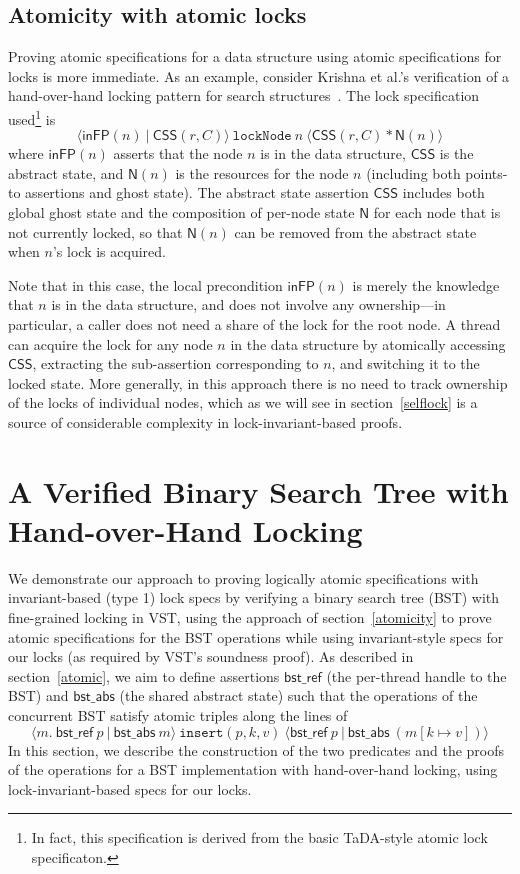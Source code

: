 \documentclass[runningheads]{llncs}
\newcommand{\treerep}{\ensuremath{\mathsf{bst\_abs}}}
\newcommand{\nodeboxrep}{\ensuremath{\mathsf{bst\_ref}}}
\begin{document}
\subsection{Atomicity with atomic locks}
Proving atomic specifications for a data structure using atomic specifications for locks is more immediate. As an example, consider Krishna et al.'s verification of a hand-over-hand locking pattern for search structures~\cite{templates}. The lock specification used\footnote{In fact, this specification is derived from the basic TaDA-style atomic lock specificaton.} is \[\langle \mathsf{inFP}(n)\ |\ \mathsf{CSS}(r, C) \rangle\ \mathtt{lockNode}\ n\ \langle \mathsf{CSS}(r, C) * \mathsf{N}(n)\rangle\] where $\mathsf{inFP}(n)$ asserts that the node $n$ is in the data structure, $\mathsf{CSS}$ is the abstract state, and $\mathsf{N}(n)$ is the resources for the node $n$ (including both points-to assertions and ghost state). The abstract state assertion $\mathsf{CSS}$ includes both global ghost state and the composition of per-node state $\mathsf{N}$ for each node that is not currently locked, so that $\mathsf{N}(n)$ can be removed from the abstract state when $n$'s lock is acquired.

Note that in this case, the local precondition $\mathsf{inFP}(n)$ is merely the knowledge that $n$ is in the data structure, and does not involve any ownership---in particular, a caller does not need a share of the lock for the root node. A thread can acquire the lock for any node $n$ in the data structure by atomically accessing $\mathsf{CSS}$, extracting the sub-assertion corresponding to $n$, and switching it to the locked state. More generally, in this approach there is no need to track ownership of the locks of individual nodes, which as we will see in section~\ref{selflock} is a source of considerable complexity in lock-invariant-based proofs.

\section{A Verified Binary Search Tree with Hand-over-Hand Locking}
\label{hand-over-hand}%

We demonstrate our approach to proving logically atomic specifications with invariant-based (type 1) lock specs by verifying a binary search tree (BST) with fine-grained locking in VST, using the approach of section~\ref{atomicity} to prove atomic specifications for the BST operations while using invariant-style specs for our locks (as required by VST's soundness proof).
As described in section~\ref{atomic}, we aim to define assertions $\nodeboxrep$ (the per-thread handle to the BST) and $\treerep$ (the shared abstract state) such that the operations of the concurrent BST satisfy atomic triples along the lines of \[\langle m.\ \nodeboxrep\ p\ |\ \treerep\ m\rangle\ \texttt{insert}(p, k, v)\ \langle \nodeboxrep\ p\ |\ \treerep\ (m[k\mapsto v])\rangle\] In this section, we describe the construction of the two predicates and the proofs of the operations for a BST implementation with hand-over-hand locking, using lock-invariant-based specs for our locks.
\end{document}
